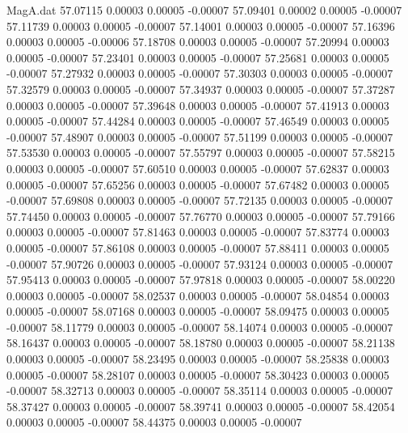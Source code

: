 \begin{filecontents}{MagA.dat}
  57.07115    0.00003    0.00005   -0.00007
  57.09401    0.00002    0.00005   -0.00007
  57.11739    0.00003    0.00005   -0.00007
  57.14001    0.00003    0.00005   -0.00007
  57.16396    0.00003    0.00005   -0.00006
  57.18708    0.00003    0.00005   -0.00007
  57.20994    0.00003    0.00005   -0.00007
  57.23401    0.00003    0.00005   -0.00007
  57.25681    0.00003    0.00005   -0.00007
  57.27932    0.00003    0.00005   -0.00007
  57.30303    0.00003    0.00005   -0.00007
  57.32579    0.00003    0.00005   -0.00007
  57.34937    0.00003    0.00005   -0.00007
  57.37287    0.00003    0.00005   -0.00007
  57.39648    0.00003    0.00005   -0.00007
  57.41913    0.00003    0.00005   -0.00007
  57.44284    0.00003    0.00005   -0.00007
  57.46549    0.00003    0.00005   -0.00007
  57.48907    0.00003    0.00005   -0.00007
  57.51199    0.00003    0.00005   -0.00007
  57.53530    0.00003    0.00005   -0.00007
  57.55797    0.00003    0.00005   -0.00007
  57.58215    0.00003    0.00005   -0.00007
  57.60510    0.00003    0.00005   -0.00007
  57.62837    0.00003    0.00005   -0.00007
  57.65256    0.00003    0.00005   -0.00007
  57.67482    0.00003    0.00005   -0.00007
  57.69808    0.00003    0.00005   -0.00007
  57.72135    0.00003    0.00005   -0.00007
  57.74450    0.00003    0.00005   -0.00007
  57.76770    0.00003    0.00005   -0.00007
  57.79166    0.00003    0.00005   -0.00007
  57.81463    0.00003    0.00005   -0.00007
  57.83774    0.00003    0.00005   -0.00007
  57.86108    0.00003    0.00005   -0.00007
  57.88411    0.00003    0.00005   -0.00007
  57.90726    0.00003    0.00005   -0.00007
  57.93124    0.00003    0.00005   -0.00007
  57.95413    0.00003    0.00005   -0.00007
  57.97818    0.00003    0.00005   -0.00007
  58.00220    0.00003    0.00005   -0.00007
  58.02537    0.00003    0.00005   -0.00007
  58.04854    0.00003    0.00005   -0.00007
  58.07168    0.00003    0.00005   -0.00007
  58.09475    0.00003    0.00005   -0.00007
  58.11779    0.00003    0.00005   -0.00007
  58.14074    0.00003    0.00005   -0.00007
  58.16437    0.00003    0.00005   -0.00007
  58.18780    0.00003    0.00005   -0.00007
  58.21138    0.00003    0.00005   -0.00007
  58.23495    0.00003    0.00005   -0.00007
  58.25838    0.00003    0.00005   -0.00007
  58.28107    0.00003    0.00005   -0.00007
  58.30423    0.00003    0.00005   -0.00007
  58.32713    0.00003    0.00005   -0.00007
  58.35114    0.00003    0.00005   -0.00007
  58.37427    0.00003    0.00005   -0.00007
  58.39741    0.00003    0.00005   -0.00007
  58.42054    0.00003    0.00005   -0.00007
  58.44375    0.00003    0.00005   -0.00007

\end{filecontents}
